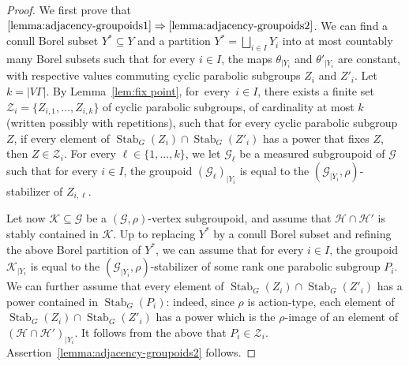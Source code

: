 \documentclass[11pt]{article}
\numberwithin{equation}{section}
\let\mathcal\mathscr
\theoremstyle{plain}
\theoremstyle{definition}
\let\Dunion\bigsqcup
\newcommand{\calg}{\mathcal{G}}
\newcommand{\calh}{\mathcal{H}}
\newcommand{\calk}{\mathcal{K}}
\newcommand{\calz}{\mathcal{Z}}
\newcommand{\Stab}{\operatorname{Stab}}
\begin{document}
\begin{proof}
We first prove that $\eqref{lemma:adjacency-groupoids1}\Rightarrow \eqref{lemma:adjacency-groupoids2}$. We can find a conull Borel subset $Y^*\subseteq Y$ and a partition $Y^*=\Dunion_{i\in I} Y_i$ into at most countably many Borel subsets such that for every $i\in I$, the maps $\theta_{|Y_i}$ and $\theta'_{|Y_i}$ are constant, with respective values commuting cyclic parabolic subgroups $Z_i$ and $Z'_i$. Let $k\!=\!|V\Gamma|$. By Lemma~\ref{lem:fix point}, for~every~\hbox{$i\!\in\!I$}, there exists a finite set $\calz_i=\{Z_{i,1},\dots,Z_{i,k}\}$ of cyclic parabolic subgroups, of cardinality at most $k$ (written possibly with repetitions), such that for every cyclic parabolic subgroup $Z$, if every element of $\Stab_G(Z_{i})\cap\Stab_G(Z'_i)$ has a power that fixes $Z$, then $Z\in\calz_i$. For every $\ell\in\{1,\dots,k\}$, we let $\calg_\ell$ be a measured subgroupoid of $\calg$ such that for every $i\in I$, the groupoid $(\calg_\ell)_{|Y_i}$ is equal to the $(\calg_{|Y_i},\rho)$-stabilizer of $Z_{i,\ell}$.

Let now $\calk\subseteq\calg$ be a $(\calg,\rho)$-vertex subgroupoid, and assume that $\calh\cap\calh'$ is stably contained in $\calk$. Up to replacing $Y^*$ by a conull Borel subset and refining the above Borel partition of $Y^*$, we can assume that for every $i\in I$, the groupoid $\calk_{|Y_i}$ is equal to the $(\calg_{|Y_i},\rho)$-stabilizer of some rank one parabolic subgroup $P_i$. We can further assume that every element of $\Stab_G(Z_i)\cap\Stab_G(Z'_i)$ has a power contained in $\Stab_G(P_i)$: indeed, since $\rho$ is action-type, each element of $\Stab_G(Z_i)\cap\Stab_G(Z'_i)$ has a power which is the $\rho$-image of an element of $(\calh\cap\calh')_{|Y_i}$. It follows from the above that $P_i\in\calz_i$. Assertion~\eqref{lemma:adjacency-groupoids2} follows.


\end{proof}
\end{document}
